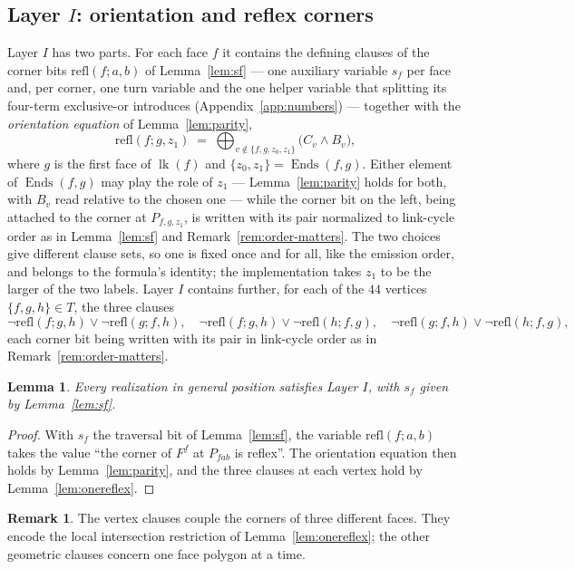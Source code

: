 \documentclass[11pt,reqno]{amsart}
\theoremstyle{plain}
\newtheorem{lemma}[theorem]{Lemma}
\theoremstyle{definition}
\newtheorem{remark}[theorem]{Remark}
\newcommand{\Ends}{\operatorname{Ends}}
\newcommand{\link}{\operatorname{lk}}
\newcommand{\refl}{\mathrm{refl}}
\begin{document}
\subsection{Layer \texorpdfstring{$I$}{I}: orientation and reflex corners}
Layer $I$ has two parts. For each face $f$ it contains the defining clauses of the corner bits
$\refl(f;a,b)$ of Lemma~\ref{lem:sf} --- one auxiliary variable $s_f$ per face and, per corner, one
turn variable and the one helper variable that splitting its four-term exclusive-or introduces
(Appendix~\ref{app:numbers}) --- together with the \emph{orientation equation} of Lemma~\ref{lem:parity},
\[
   \refl(f;g,z_1)\;=\;\bigoplus_{v\notin\{f,g,z_0,z_1\}} \big(C_v\wedge B_v\big),
\]
where $g$ is the first face of $\link(f)$ and $\{z_0,z_1\}=\Ends(f,g)$.
Either element of $\Ends(f,g)$ may play the role of $z_1$ --- Lemma~\ref{lem:parity} holds for
both, with $B_v$ read relative to the chosen one --- while the corner bit on the left, being attached
to the corner at $P_{f,g,z_1}$, is written with its pair normalized to link-cycle order as in
Lemma~\ref{lem:sf} and Remark~\ref{rem:order-matters}. The two choices give different clause sets, so
one is fixed once and for all, like the emission order, and belongs to the formula's identity; the
implementation takes $z_1$ to be the larger of the two labels. Layer $I$ contains further,
for each of the $44$ vertices $\{f,g,h\}\in T$, the three clauses
\[
   \neg\refl(f;g,h)\vee\neg\refl(g;f,h),\quad
   \neg\refl(f;g,h)\vee\neg\refl(h;f,g),\quad
   \neg\refl(g;f,h)\vee\neg\refl(h;f,g),
\]
each corner bit being written with its pair in link-cycle order as in Remark~\ref{rem:order-matters}.

\begin{lemma}\label{lem:I}
Every realization in general position satisfies Layer $I$, with $s_f$ given by
Lemma~\ref{lem:sf}.
\end{lemma}

\begin{proof}
With $s_f$ the traversal bit of Lemma~\ref{lem:sf}, the variable $\refl(f;a,b)$ takes the value ``the
corner of $F^f$ at $P_{fab}$ is reflex''. The orientation equation then holds by
Lemma~\ref{lem:parity}, and the three clauses at each vertex hold by Lemma~\ref{lem:onereflex}.
\end{proof}

\begin{remark}
The vertex clauses couple the corners of three different faces. They encode the local
intersection restriction of Lemma~\ref{lem:onereflex}; the other geometric clauses concern
one face polygon at a time.
\end{remark}
\end{document}
